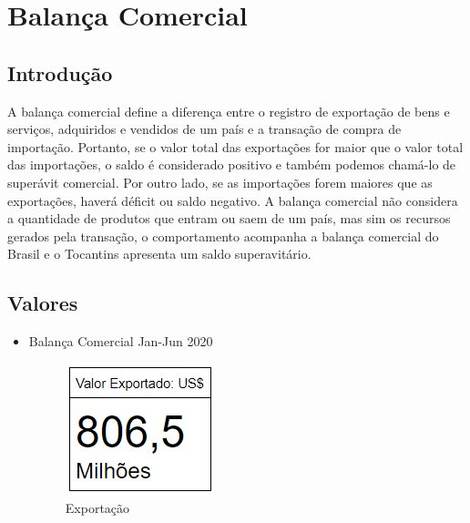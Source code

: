 \chapter{Balança Comercial}
\section{Introdução}
\par A balança comercial define a diferença entre o registro de exportação de bens e serviços, adquiridos e vendidos de um país e a transação de compra de importação. Portanto, se o valor total das exportações for maior que o valor total das importações, o saldo é considerado positivo e também podemos chamá-lo de superávit comercial. Por outro lado, se as importações forem maiores que as exportações, haverá déficit ou saldo negativo. A balança comercial não considera a quantidade de produtos que entram ou saem de um país, mas sim os recursos gerados pela transação, o comportamento acompanha a balança comercial do Brasil e o Tocantins apresenta um saldo superavitário.

\section{Valores}
\begin{itemize}
	\item Balança Comercial Jan-Jun 2020
	\begin{figure}[h]
	\caption{Exportação}
	\includegraphics[width=\linewidth]{fig/exp1.png}
\end{figure}

\end{itemize}

